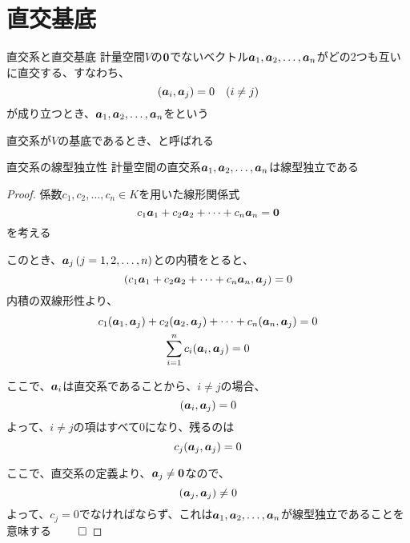 \documentclass[../../../topic_linear-algebra]{subfiles}
\begin{document}
\sectionline
\section{直交基底}

\begin{definition}{直交系と直交基底}
  計量空間$V$の$\vb*{0}$でないベクトル$\vb*{a}_1, \vb*{a}_2, \ldots, \vb*{a}_n$がどの2つも互いに直交する、すなわち、
  \begin{equation*}
    (\vb*{a}_i, \vb*{a}_j) = 0 \quad (i \neq j)
  \end{equation*}
  が成り立つとき、$\vb*{a}_1, \vb*{a}_2, \ldots, \vb*{a}_n$をという

  直交系が$V$の基底であるとき、と呼ばれる
\end{definition}

\sectionline

\begin{theorem}{直交系の線型独立性}
  計量空間の直交系$\vb*{a}_1, \vb*{a}_2, \ldots, \vb*{a}_n$は線型独立である
\end{theorem}

\begin{proof}
  係数$c_1, c_2, \ldots, c_n \in K$を用いた線形関係式
  \begin{equation*}
    c_1 \vb*{a}_1 + c_2 \vb*{a}_2 + \cdots + c_n \vb*{a}_n = \vb*{0}
  \end{equation*}
  を考える

  このとき、$\vb*{a}_j \, (j=1,2,\ldots,n)$との内積をとると、
  \begin{equation*}
    (c_1 \vb*{a}_1 + c_2 \vb*{a}_2 + \cdots + c_n \vb*{a}_n, \vb*{a}_j) = 0
  \end{equation*}
  内積の双線形性より、
  \begin{gather*}
    c_1 (\vb*{a}_1, \vb*{a}_j) + c_2 (\vb*{a}_2, \vb*{a}_j) + \cdots + c_n (\vb*{a}_n, \vb*{a}_j) = 0 \\
    \sum_{i=1}^n c_i (\vb*{a}_i, \vb*{a}_j) = 0
  \end{gather*}

  ここで、$\vb*{a}_i$は直交系であることから、$i \neq j$の場合、
  \begin{equation*}
    (\vb*{a}_i, \vb*{a}_j) = 0
  \end{equation*}
  よって、$i \neq j$の項はすべて0になり、残るのは
  \begin{equation*}
    c_j (\vb*{a}_j, \vb*{a}_j) = 0
  \end{equation*}

  ここで、直交系の定義より、$\vb*{a}_j \neq \vb*{0}$なので、
  \begin{equation*}
    (\vb*{a}_j, \vb*{a}_j) \neq 0
  \end{equation*}
  よって、$c_j = 0$でなければならず、これは$\vb*{a}_1, \vb*{a}_2, \ldots, \vb*{a}_n$が線型独立であることを意味する $\qed$
\end{proof}
\end{document}
